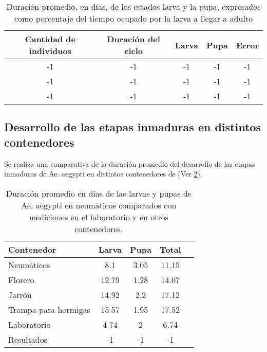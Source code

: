 \begin{table}
\begin{tabular}{c c c c c }
Cantidad de individuos & Duración del ciclo & Larva & Pupa  & Error\\
\hline
-1   & -1 & -1 & -1 & -1   \\
-1   & -1 & -1 & -1 & -1   \\
-1   & -1 & -1 & -1 & -1   \\
\end{tabular}
\caption{ \label{tab:desarrollo-ciclo-distribucion-test} Duración promedio, en días, de los estados larva
y la pupa, expresados como porcentaje del tiempo ocupado por la larva a llegar a adulto}
\end{table}

\subsection{Desarrollo de las etapas inmaduras en distintos contenedores}
Se realiza una comparativa de la duración promedio del desarrollo de las etapas inmaduras de Ae. aegypti 
en distintos contenedores de \cite{manrique1998desarrollo} (Ver 
\ref{tab:desarrollo-ciclo-contenedores-test}).

\begin{table}
\begin{tabular}{p{5cm} c c c c }
Contenedor           & Larva & Pupa & Total \\
\hline
Neumáticos           & 8.1   & 3.05 & 11.15\\
Florero              & 12.79 & 1.28 & 14.07\\
Jarrón               & 14.92 & 2.2  & 17.12\\
Trampa para hormigas & 15.57 & 1.95 & 17.52\\
Laboratorio          & 4.74  & 2    & 6.74\\
Resultados           & -1    & -1   & -1\\
\end{tabular}

\caption{ \label{tab:desarrollo-ciclo-contenedores-test} Duración promedio en días de las  larvas y pupas
de Ae. aegypti en neumáticos comparados con mediciones en el laboratorio y en otros contenedores.}
\end{table}

